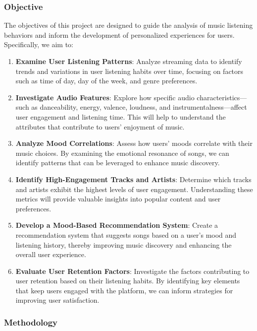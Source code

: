 \documentclass[
]{article}
\begin{document}
\subsubsection{Objective}\label{objective}

The objectives of this project are designed to guide the analysis of
music listening behaviors and inform the development of personalized
experiences for users. Specifically, we aim to:

\begin{enumerate}
\def\labelenumi{\arabic{enumi}.}
\item
  \textbf{Examine User Listening Patterns}: Analyze streaming data to
  identify trends and variations in user listening habits over time,
  focusing on factors such as time of day, day of the week, and genre
  preferences.
\item
  \textbf{Investigate Audio Features}: Explore how specific audio
  characteristics---such as danceability, energy, valence, loudness, and
  instrumentalness---affect user engagement and listening time. This
  will help to understand the attributes that contribute to users'
  enjoyment of music.
\item
  \textbf{Analyze Mood Correlations}: Assess how users' moods correlate
  with their music choices. By examining the emotional resonance of
  songs, we can identify patterns that can be leveraged to enhance music
  discovery.
\item
  \textbf{Identify High-Engagement Tracks and Artists}: Determine which
  tracks and artists exhibit the highest levels of user engagement.
  Understanding these metrics will provide valuable insights into
  popular content and user preferences.
\item
  \textbf{Develop a Mood-Based Recommendation System}: Create a
  recommendation system that suggests songs based on a user's mood and
  listening history, thereby improving music discovery and enhancing the
  overall user experience.
\item
  \textbf{Evaluate User Retention Factors}: Investigate the factors
  contributing to user retention based on their listening habits. By
  identifying key elements that keep users engaged with the platform, we
  can inform strategies for improving user satisfaction.
\end{enumerate}

\subsubsection{Methodology}\label{methodology}
\end{document}
